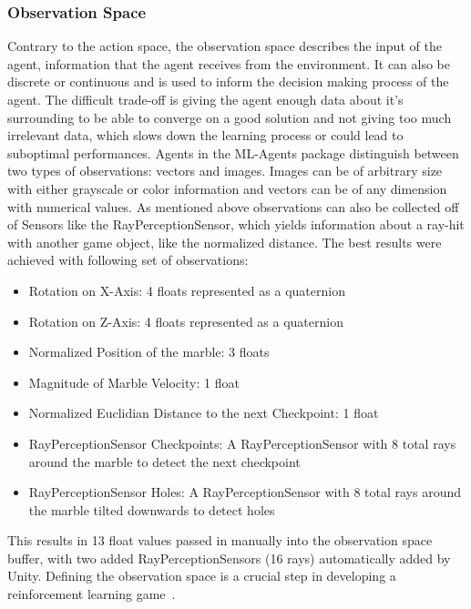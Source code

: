 \subsubsection{Observation Space}
Contrary to the action space, the observation space describes the input of the agent, information that the agent receives from the environment.
It can also be discrete or continuous and is used to inform the decision making process of the agent.
The difficult trade-off is giving the agent enough data about it's surrounding to be able to converge on a good solution and not giving
too much irrelevant data, which slows down the learning process or could lead to suboptimal performances.
Agents in the ML-Agents package distinguish between two types of observations: vectors and images.
Images can be of arbitrary size with either grayscale or color information and vectors can be of any dimension with numerical values.
As mentioned above observations can also be collected off of Sensors like the RayPerceptionSensor, which yields information about
a ray-hit with another game object, like the normalized distance.
The best results were achieved with following set of observations:
\begin{itemize}
    \item{Rotation on X-Axis}: 4 floats represented as a quaternion
    \item{Rotation on Z-Axis}: 4 floats represented as a quaternion
    \item{Normalized Position of the marble}: 3 floats
    \item{Magnitude of Marble Velocity}: 1 float
    \item{Normalized Euclidian Distance to the next Checkpoint}: 1 float
    \item{RayPerceptionSensor Checkpoints}: A RayPerceptionSensor with 8 total rays around the marble to detect the next checkpoint
    \item{RayPerceptionSensor Holes}: A RayPerceptionSensor with 8 total rays around the marble tilted downwards to detect holes
\end{itemize}
This results in 13 float values passed in manually into the observation space buffer, with two added RayPerceptionSensors (16 rays)
automatically added by Unity.
Defining the observation space is a crucial step in developing a reinforcement learning game~\cite{song_observational_2019}.

